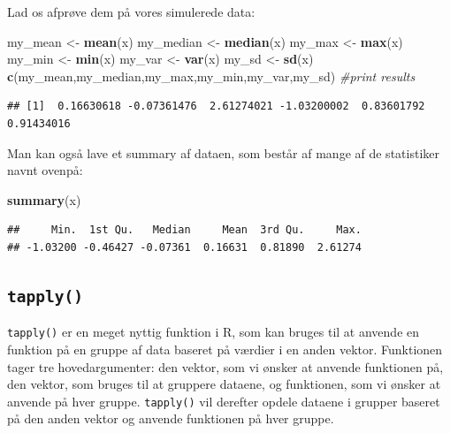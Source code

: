 \documentclass[
]{book}
\newenvironment{Shaded}{\begin{snugshade}}{\end{snugshade}}
\newcommand{\CommentTok}[1]{\textcolor[rgb]{0.56,0.35,0.01}{\textit{#1}}}
\newcommand{\FunctionTok}[1]{\textcolor[rgb]{0.13,0.29,0.53}{\textbf{#1}}}
\newcommand{\NormalTok}[1]{#1}
\newcommand{\OtherTok}[1]{\textcolor[rgb]{0.56,0.35,0.01}{#1}}
\theoremstyle{definition}
\theoremstyle{definition}
\theoremstyle{definition}
\theoremstyle{definition}
\theoremstyle{remark}
\begin{document}
Lad os afprøve dem på vores simulerede data:

\begin{Shaded}
\begin{Highlighting}[]
\NormalTok{my\_mean }\OtherTok{\textless{}{-}} \FunctionTok{mean}\NormalTok{(x)}
\NormalTok{my\_median }\OtherTok{\textless{}{-}} \FunctionTok{median}\NormalTok{(x)}
\NormalTok{my\_max }\OtherTok{\textless{}{-}} \FunctionTok{max}\NormalTok{(x)}
\NormalTok{my\_min }\OtherTok{\textless{}{-}} \FunctionTok{min}\NormalTok{(x)}
\NormalTok{my\_var }\OtherTok{\textless{}{-}} \FunctionTok{var}\NormalTok{(x)}
\NormalTok{my\_sd }\OtherTok{\textless{}{-}} \FunctionTok{sd}\NormalTok{(x)}
\FunctionTok{c}\NormalTok{(my\_mean,my\_median,my\_max,my\_min,my\_var,my\_sd) }\CommentTok{\#print results}
\end{Highlighting}
\end{Shaded}

\begin{verbatim}
## [1]  0.16630618 -0.07361476  2.61274021 -1.03200002  0.83601792  0.91434016
\end{verbatim}

Man kan også lave et summary af dataen, som består af mange af de statistiker navnt ovenpå:

\begin{Shaded}
\begin{Highlighting}[]
\FunctionTok{summary}\NormalTok{(x)}
\end{Highlighting}
\end{Shaded}

\begin{verbatim}
##     Min.  1st Qu.   Median     Mean  3rd Qu.     Max. 
## -1.03200 -0.46427 -0.07361  0.16631  0.81890  2.61274
\end{verbatim}

\subsection{\texorpdfstring{\texttt{tapply()}}{tapply()}}\label{tapply}

\texttt{tapply()} er en meget nyttig funktion i R, som kan bruges til at anvende en funktion på en gruppe af data baseret på værdier i en anden vektor. Funktionen tager tre hovedargumenter: den vektor, som vi ønsker at anvende funktionen på, den vektor, som bruges til at gruppere dataene, og funktionen, som vi ønsker at anvende på hver gruppe. \texttt{tapply()} vil derefter opdele dataene i grupper baseret på den anden vektor og anvende funktionen på hver gruppe.
\end{document}
